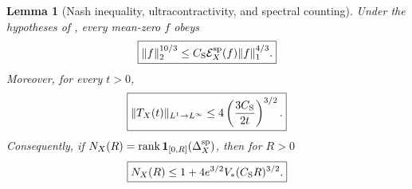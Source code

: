 \documentclass[11pt]{article}
\newtheorem{lemma}[lemma]{Lemma}
\theoremstyle{definition}
\theoremstyle{remark}
\newcommand{\one}{\mathbf 1}
\newcommand{\rank}{\operatorname{rank}}
\begin{document}
\begin{lemma}[Nash inequality, ultracontractivity, and spectral counting]
\label{lem:supp-nash-counting}
Under the hypotheses of , every mean-zero $f$ obeys
\begin{equation}
 \boxed{
 \|f\|_2^{10/3}
 \le C_{\rm S}\mathcal E_X^{\rm sp}(f)\|f\|_1^{4/3}.}
 \label{eq:supp-nash}
\end{equation}
Moreover, for every $t>0$,
\begin{equation}
 \boxed{
 \|T_X(t)\|_{L^1\to L^\infty}
 \le4\left(\frac{3C_{\rm S}}{2t}\right)^{3/2}.}
 \label{eq:supp-ultracontractive}
\end{equation}
Consequently, if
$N_X(R)=\rank\one_{[0,R]}(\Delta_X^{\rm sp})$, then for $R>0$
\begin{equation}
 \boxed{
 N_X(R)\le1+4e^{3/2}V_*(C_{\rm S}R)^{3/2}.}
 \label{eq:supp-global-weyl-count}
\end{equation}
\end{lemma}
\end{document}
